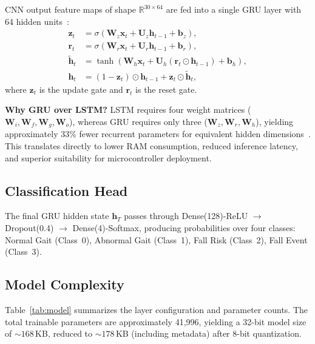 \documentclass[conference]{IEEEtran}
\begin{document}
CNN output feature maps of shape $\mathbb{R}^{30 \times 64}$ are fed into
a single GRU layer with 64 hidden units~\cite{cho2014}:
\begin{align}
  \mathbf{z}_t &= \sigma\!\left(\mathbf{W}_z\mathbf{x}_t
    + \mathbf{U}_z\mathbf{h}_{t-1} + \mathbf{b}_z\right), \label{eq:gru1}\\
  \mathbf{r}_t &= \sigma\!\left(\mathbf{W}_r\mathbf{x}_t
    + \mathbf{U}_r\mathbf{h}_{t-1} + \mathbf{b}_r\right), \label{eq:gru2}\\
  \tilde{\mathbf{h}}_t &= \tanh\!\left(\mathbf{W}_h\mathbf{x}_t
    + \mathbf{U}_h(\mathbf{r}_t \odot \mathbf{h}_{t-1})
    + \mathbf{b}_h\right), \label{eq:gru3}\\
  \mathbf{h}_t &= (1 - \mathbf{z}_t) \odot \mathbf{h}_{t-1}
    + \mathbf{z}_t \odot \tilde{\mathbf{h}}_t, \label{eq:gru4}
\end{align}
where $\mathbf{z}_t$ is the update gate and $\mathbf{r}_t$ is the reset
gate.

\textbf{Why GRU over LSTM?} LSTM requires four weight matrices
($\mathbf{W}_i, \mathbf{W}_f, \mathbf{W}_g, \mathbf{W}_o$), whereas GRU
requires only three ($\mathbf{W}_z, \mathbf{W}_r, \mathbf{W}_h$), yielding
approximately 33\% fewer recurrent parameters for equivalent hidden
dimensions~\cite{cho2014}. This translates directly to lower RAM
consumption, reduced inference latency, and superior suitability for
microcontroller deployment.

\subsection{Classification Head}

The final GRU hidden state $\mathbf{h}_T$ passes through
Dense(128)-ReLU $\rightarrow$ Dropout(0.4) $\rightarrow$
Dense(4)-Softmax, producing probabilities over four classes: Normal Gait
(Class~0), Abnormal Gait (Class~1), Fall Risk (Class~2), Fall Event
(Class~3).

\subsection{Model Complexity}

Table~\ref{tab:model} summarizes the layer configuration and parameter
counts. The total trainable parameters are approximately 41{,}996, yielding
a 32-bit model size of ${\sim}168$\,KB, reduced to ${\sim}178$\,KB
(including metadata) after 8-bit quantization.
\end{document}
